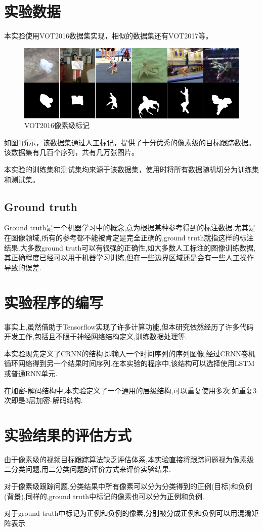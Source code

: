 \section{实验数据}
本实验使用VOT2016数据集\supercite{Vojir-TR-2017-01}实现，相似的数据集还有VOT2017等。
\par
\begin{figure}[htbp!]
    \centering
    \includegraphics[width = 1.\textwidth]{chap/img/vot_2016_pixel.png}
    \caption{VOT2016像素级标记}\label{fig:vot_2016_pixel}
\end{figure}
\par
如图\ref{fig:vot_2016_pixel}所示，该数据集通过人工标记，提供了十分优秀的像素级的目标跟踪数据。该数据集有几百个序列，共有几万张图片。
\par
本实验的训练集和测试集均来源于该数据集，使用时将所有数据随机切分为训练集和测试集。
\subsection{Ground truth}
Ground truth是一个机器学习中的概念,意为根据某种参考得到的标注数据.尤其是在图像领域,所有的参考都不能被肯定是完全正确的,ground truth就指这样的标注结果.大多数ground truth可以有很强的正确性,如大多数人工标注的图像训练数据,其正确程度已经可以用于机器学习训练,但在一些边界区域还是会有一些人工操作导致的误差.

\section{实验程序的编写}
事实上,虽然借助于Tensorflow实现了许多计算功能,但本研究依然经历了许多代码开发工作,包括且不限于神经网络结构定义,训练数据处理等.
\par
本实验现先定义了CRNN的结构,即输入一个时间序列的序列图像,经过CRNN卷机循环网络得到另一个结果时间序列.在本实验的程序中,该结构可以选择使用LSTM或普通RNN单元.
\par
在加密-解码结构中,本实验定义了一个通用的层级结构,可以重复使用多次.如重复3次即是3层加密-解码结构.

\section{实验结果的评估方式}
由于像素级的视频目标跟踪算法缺乏评估体系,本实验直接将跟踪问题视为像素级二分类问题,用二分类问题的评价方式来评价实验结果.
\par
对于像素级跟踪问题,分类结果中所有像素可以分为分类得到的正例(目标)和负例(背景),同样的,ground truth中标记的像素也可以分为正例和负例.
\par
对于ground truth中标记为正例和负例的像素,分别被分成正例和负例可以用混淆矩阵表示
